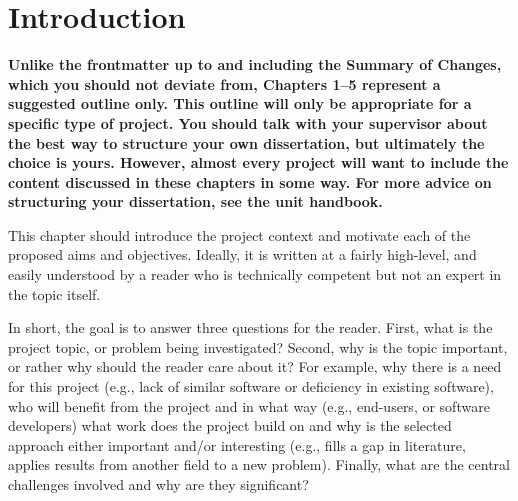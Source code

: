 \documentclass[ oneside,%
                    author={Michael Wray},
                    degree={BSc},
                     title={Some Structural Guidelines for CS Project Dissertations \\ With a Second Line Added to the Title},
                    unit={COMS30045},
                    subtitle={And Even A Fancy Subtitle}]{dissertation}
\begin{document}

%

\mainmatter


\chapter{Introduction}
\label{chap:context}

{\bf Unlike the frontmatter up to and including the Summary of Changes, which you should not deviate from, Chapters 1--5 represent a suggested outline only. This outline will only be appropriate for a specific type of project. You should talk with your supervisor about the best way to structure your own dissertation, but ultimately the choice is yours. However, almost every project will want to include the content discussed in these chapters in some way. For more advice on structuring your dissertation, see the unit handbook.}
\vspace{1cm} 

\noindent
This chapter should introduce the project context and motivate each of the proposed aims and objectives.  Ideally, it is written at a fairly high-level, and easily understood by a reader who is technically competent but not an expert in the topic itself.

In short, the goal is to answer three questions for the reader.  First, what is the project topic, or problem being investigated?  Second, why is the topic important, or rather why should the reader care about it?  For example, why there is a need for this project (e.g., lack of similar software or deficiency in existing software), who will benefit from the project and in what way (e.g., end-users, or software developers) what work does the project build on and why is the selected approach either important and/or interesting (e.g., fills a gap in literature, applies results from another field to a new problem).  Finally, what are the central challenges involved and why are they significant? 
 
\end{document}

